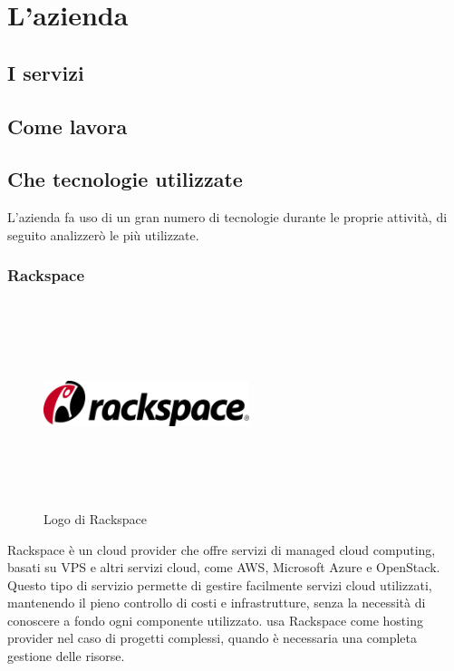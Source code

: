 \chapter{L'azienda\label{cap:lazienda}}

\section{I servizi}

\section{Come lavora}

\section{Che tecnologie utilizzate}
L'azienda fa uso di un gran numero di tecnologie durante le proprie attività, di seguito analizzerò le più utilizzate.

\subsection{Rackspace}
\begin{figure}[htbp]
   \begin{center}
      \includegraphics[width=6cm,height=6cm,keepaspectratio]{immagini/rackspace-logo}
   \end{center}
   \caption{Logo di Rackspace}
\end{figure}
Rackspace è un cloud provider che offre servizi di managed cloud computing, basati su VPS e altri servizi cloud, come AWS, Microsoft Azure e OpenStack. Questo tipo di servizio permette di gestire facilmente servizi cloud utilizzati, mantenendo il pieno controllo di costi e infrastrutture, senza la necessità di conoscere a fondo ogni componente utilizzato.
\nomeAzienda{} usa Rackspace come hosting provider nel caso di progetti complessi, quando è necessaria una completa gestione delle risorse.

